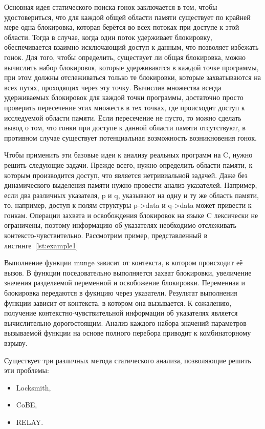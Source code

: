 Основная идея статического поиска гонок заключается в том, чтобы удостовериться, что для каждой общей области памяти существует по крайней мере одна блокировка, которая берётся во всех потоках при доступе к этой области. Тогда в случае, когда один поток удерживает блокировку, обеспечивается взаимно исключающий доступ к данным, что позволяет избежать гонок. Для того, чтобы определить, существует ли общая блокировка, можно вычислить набор блокировок, которые удерживаются в каждой точке программы, при этом должны отслеживаться только те блокировки, которые захватываются на всех путях, проходящих через эту точку. Вычислив множества всегда удерживаемых блокировок для каждой точки программы, достаточно просто проверить пересечение этих множеств в тех точках, где происходит доступ к исследуемой области памяти. Если пересечение не пусто, то можно сделать вывод о том, что гонки при доступе к данной области памяти отсутствуют, в противном случае существует потенциальная возможность возникновения гонок.

Чтобы применить эти базовые идеи к анализу реальных программ на C, нужно решить следующие задачи. Прежде всего, нужно определить области памяти, к которым производится доступ, что является нетривиальной задачей. Даже без динамического выделения памяти нужно провести анализ указателей. Например, если два различных указателя, p и q, указывают на одну и ту же область памяти, то, например, доступ к полям структуры p->data и q->data может привести к гонкам. Операции захвата и освобождения блокировок на языке C лексически не ограничены, поэтому информацию об указателях необходимо отслеживать контексто-чувствительно. Рассмотрим пример, представленный в листинге~\ref{lst:example1} 



Выполнение функции munge зависит от контекста, в котором происходит её вызов. В функции поседовательно выполняется захват блокировки, увеличение значения разделяемой переменной и освобожение блокировки. Переменная и блокировка передаются в фукнцию через указатели. Результат выполнения функции зависит от контекста, в котором она вызывается. К сожалению, получение контекстно-чувствительной информации об указателях является вычислительно дорогостоящим. Анализ каждого набора значений параметров вызываемой функции на основе полного перебора приводит к комбинаторному взрыву.

Существует три различных метода статического анализа, позволяющие решить эти проблемы:
\begin{itemize}
\item Locksmith,
\item CoBE,
\item RELAY.
\end{itemize}

